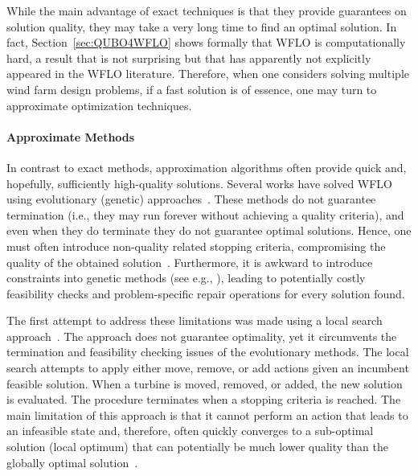 \documentclass[preprint,12pt]{elsarticle}
\begin{document}
While the main advantage of exact techniques
is that they provide guarantees on solution quality, they may take a very long time to  find an optimal solution. 
In fact, Section~\ref{sec:QUBO4WFLO} shows formally that WFLO is computationally hard, a result
that is not surprising but that has apparently not explicitly appeared in the WFLO literature. Therefore,
when one considers solving multiple wind farm design problems, if a fast solution is of essence,
one may turn to approximate optimization techniques.

\paragraph{Approximate Methods} In contrast to exact methods, approximation algorithms often provide   
quick and, hopefully, sufficiently high-quality solutions. Several works have solved 
WFLO using evolutionary (genetic) approaches~\cite{MOSETTI1994105,gonzalez2010optimization,grady2005placement}. 
These methods do not guarantee termination 
(i.e., they may run forever without achieving a quality criteria), and even when they do terminate they do
not guarantee optimal solutions. Hence, one must often
introduce non-quality related stopping criteria, 
compromising the quality of the obtained solution~\cite{davis1991handbook}.
Furthermore, it is awkward to introduce constraints into genetic methods (see e.g., \cite{sorkhabi2018constrained}), leading to potentially costly feasibility checks and problem-specific repair operations for every solution found. 

The first attempt to address these limitations 
was made using a local search approach~\cite{ozturk2004heuristic}. 
The approach does not guarantee optimality, 
yet it circumvents the termination and feasibility checking issues of the evolutionary
methods. The local search attempts to apply either move, remove, or add actions given an incumbent 
feasible solution. When a turbine is moved, removed, or added, the new solution is evaluated. The procedure terminates 
when a stopping criteria is reached.
The main limitation of this approach 
is that it cannot perform an action 
that leads to an infeasible state and, therefore, often quickly converges to a sub-optimal solution (local optimum) 
that can potentially be much lower quality than the globally optimal solution~\cite{rivas2009solving}. 
\end{document}

